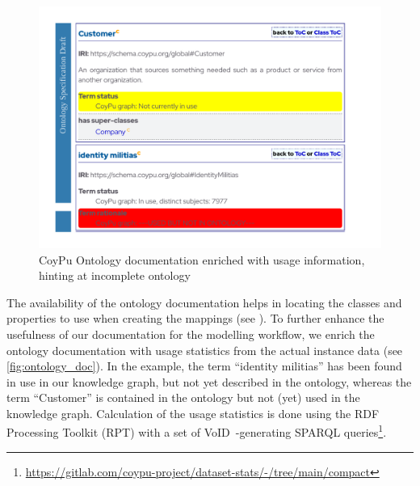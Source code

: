 \documentclass[
hf
]{ceurart}
\begin{document}
\begin{figure}
    \centering
    \includegraphics[width=\textwidth,trim={1cm 1cm 1cm 3.5cm},clip]{CoyPu Ontology.pdf}
    \caption{CoyPu Ontology documentation %
    enriched with usage information, hinting at %
    incomplete ontology}
    \label{fig:ontology_doc}
\end{figure}

The availability of the ontology documentation helps in locating the classes and properties to use when creating the mappings (see ).
To further enhance the usefulness of our documentation for the modelling workflow, we enrich the ontology documentation with usage statistics from the actual instance data (see \autoref{fig:ontology_doc}). In the example, the term ``identity militias'' has been found in use in our knowledge graph, but not yet described in the ontology, whereas the term ``Customer'' is contained in the ontology but not (yet) used in the knowledge graph. Calculation of the usage statistics is done using the RDF Processing Toolkit (RPT) with a set of VoID~\cite{alexander2011describing}-generating SPARQL queries\footnote{\url{https://gitlab.com/coypu-project/dataset-stats/-/tree/main/compact}}.
\end{document}
